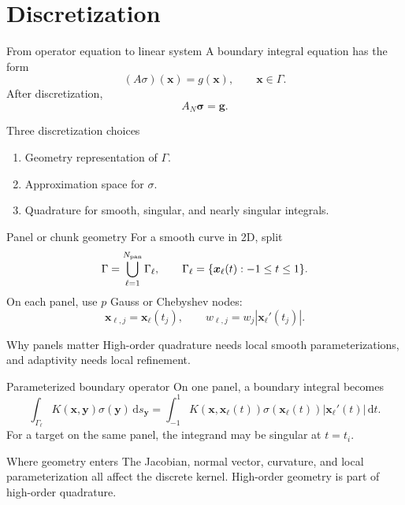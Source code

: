 \documentclass[aspectratio=169,11pt]{beamer}
\newcommand{\dd}{\,\mathrm d}
\newcommand{\x}{\bm{x}}
\newcommand{\y}{\bm{y}}
\begin{document}
\section{Discretization}

\begin{frame}{From operator equation to linear system}
\small
A boundary integral equation has the form
\[
  (A\sigma)(\x)=g(\x),\qquad \x\in\Gamma.
\]
After discretization,
\[
  A_N\bm\sigma=\bm g.
\]

\begin{block}{Three discretization choices}
\begin{enumerate}
  \item Geometry representation of $\Gamma$.
  \item Approximation space for $\sigma$.
  \item Quadrature for smooth, singular, and nearly singular integrals.
\end{enumerate}
\end{block}
\end{frame}

\begin{frame}{Panel or chunk geometry}
\small
For a smooth curve in 2D, split
\[
  \Gamma=\bigcup_{\ell=1}^{N_{\rm pan}}\Gamma_\ell,\qquad
  \Gamma_\ell=\{\x_\ell(t): -1\le t\le1\}.
\]
On each panel, use $p$ Gauss or Chebyshev nodes:
\[
  \x_{\ell,j}=\x_\ell(t_j),\qquad
  w_{\ell,j}=w_j|\x_\ell'(t_j)|.
\]

\begin{block}{Why panels matter}
High-order quadrature needs local smooth parameterizations, and adaptivity
needs local refinement.
\end{block}
\end{frame}

\begin{frame}{Parameterized boundary operator}
\small
On one panel, a boundary integral becomes
\[
\int_{\Gamma_\ell}K(\x,\y)\sigma(\y)\dd s_{\y}
=
\int_{-1}^{1}
K(\x,\x_\ell(t))\sigma(\x_\ell(t))|\x_\ell'(t)|\dd t.
\]
For a target on the same panel, the integrand may be singular at $t=t_i$.

\begin{block}{Where geometry enters}
The Jacobian, normal vector, curvature, and local parameterization all affect
the discrete kernel. High-order geometry is part of high-order quadrature.
\end{block}
\end{frame}
\end{document}
